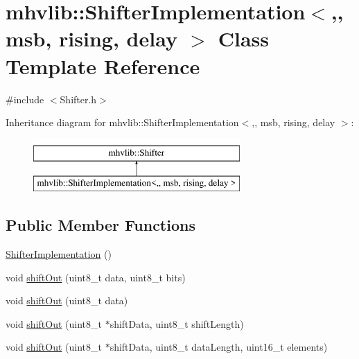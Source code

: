 \hypertarget{classmhvlib_1_1_shifter_implementation}{\section{mhvlib\-:\-:Shifter\-Implementation$<$,, msb, rising, delay $>$ Class Template Reference}
\label{classmhvlib_1_1_shifter_implementation}
}


{\ttfamily \#include $<$Shifter.\-h$>$}

Inheritance diagram for mhvlib\-:\-:Shifter\-Implementation$<$,, msb, rising, delay $>$\-:\begin{figure}[H]
\begin{center}
\leavevmode
\includegraphics[height=2.000000cm]{classmhvlib_1_1_shifter_implementation}
\end{center}
\end{figure}
\subsection*{Public Member Functions}
\begin{DoxyCompactItemize}
\item 
\hyperlink{classmhvlib_1_1_shifter_implementation_a3d4613ec3f880cbf6b671a7bfe0bf60f}{Shifter\-Implementation} ()
\item 
void \hyperlink{classmhvlib_1_1_shifter_implementation_a8fd9775b7edfd4c7ec83b9086be3a549}{shift\-Out} (uint8\-\_\-t data, uint8\-\_\-t bits)
\item 
void \hyperlink{classmhvlib_1_1_shifter_implementation_a3374674d96c99f76fbdbcd87e540da59}{shift\-Out} (uint8\-\_\-t data)
\item 
void \hyperlink{classmhvlib_1_1_shifter_implementation_a33a7d4c3c391027151693fce12b2a605}{shift\-Out} (uint8\-\_\-t $\ast$shift\-Data, uint8\-\_\-t shift\-Length)
\item 
void \hyperlink{classmhvlib_1_1_shifter_implementation_a5935d02b862d802c517e9e9093385681}{shift\-Out} (uint8\-\_\-t $\ast$shift\-Data, uint8\-\_\-t data\-Length, uint16\-\_\-t elements)
\end{DoxyCompactItemize}


